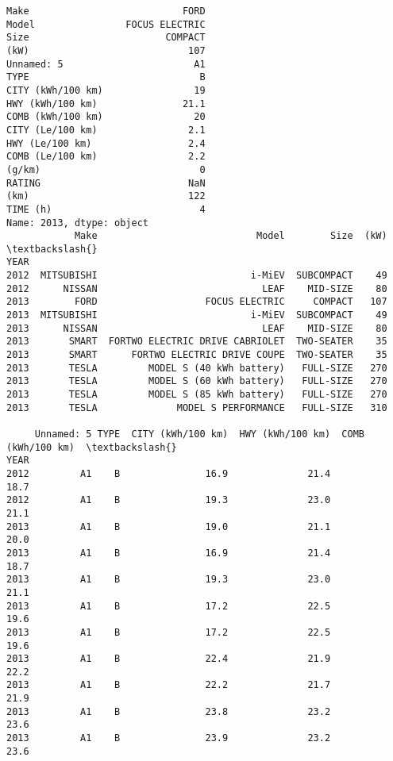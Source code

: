 \documentclass[11pt]{article}
\begin{document}
    \begin{Verbatim}[commandchars=\\\{\}]
Make                           FORD
Model                FOCUS ELECTRIC
Size                        COMPACT
(kW)                            107
Unnamed: 5                       A1
TYPE                              B
CITY (kWh/100 km)                19
HWY (kWh/100 km)               21.1
COMB (kWh/100 km)                20
CITY (Le/100 km)                2.1
HWY (Le/100 km)                 2.4
COMB (Le/100 km)                2.2
(g/km)                            0
RATING                          NaN
(km)                            122
TIME (h)                          4
Name: 2013, dtype: object
            Make                            Model        Size  (kW)  \textbackslash{}
YEAR                                                                  
2012  MITSUBISHI                           i-MiEV  SUBCOMPACT    49   
2012      NISSAN                             LEAF    MID-SIZE    80   
2013        FORD                   FOCUS ELECTRIC     COMPACT   107   
2013  MITSUBISHI                           i-MiEV  SUBCOMPACT    49   
2013      NISSAN                             LEAF    MID-SIZE    80   
2013       SMART  FORTWO ELECTRIC DRIVE CABRIOLET  TWO-SEATER    35   
2013       SMART      FORTWO ELECTRIC DRIVE COUPE  TWO-SEATER    35   
2013       TESLA         MODEL S (40 kWh battery)   FULL-SIZE   270   
2013       TESLA         MODEL S (60 kWh battery)   FULL-SIZE   270   
2013       TESLA         MODEL S (85 kWh battery)   FULL-SIZE   270   
2013       TESLA              MODEL S PERFORMANCE   FULL-SIZE   310   

     Unnamed: 5 TYPE  CITY (kWh/100 km)  HWY (kWh/100 km)  COMB (kWh/100 km)  \textbackslash{}
YEAR                                                                           
2012         A1    B               16.9              21.4               18.7   
2012         A1    B               19.3              23.0               21.1   
2013         A1    B               19.0              21.1               20.0   
2013         A1    B               16.9              21.4               18.7   
2013         A1    B               19.3              23.0               21.1   
2013         A1    B               17.2              22.5               19.6   
2013         A1    B               17.2              22.5               19.6   
2013         A1    B               22.4              21.9               22.2   
2013         A1    B               22.2              21.7               21.9   
2013         A1    B               23.8              23.2               23.6   
2013         A1    B               23.9              23.2               23.6   


\end{Verbatim}
\end{document}
